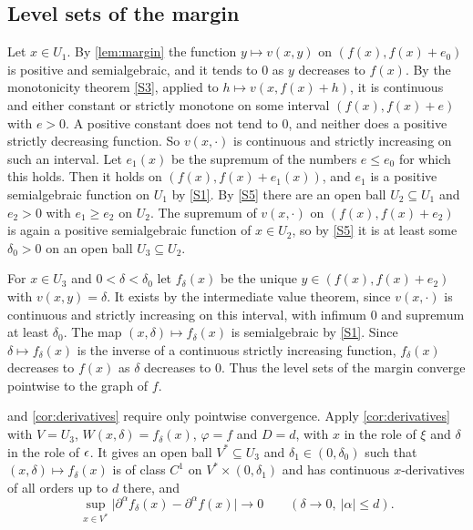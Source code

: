 \subsection{Level sets of the margin}\label{sec:universal-levels}

Let $x\in U_1$. By \cref{lem:margin} the function $y\mapsto v(x,y)$ on $(f(x),f(x)+e_0)$ is positive and semialgebraic, and it tends to $0$ as $y$ decreases to $f(x)$. By the monotonicity theorem \ref{S3}, applied to $h\mapsto v(x,f(x)+h)$, it is continuous and either constant or strictly monotone on some interval $(f(x),f(x)+e)$ with $e>0$. A positive constant does not tend to $0$, and neither does a positive strictly decreasing function. So $v(x,\cdot)$ is continuous and strictly increasing on such an interval. Let $e_1(x)$ be the supremum of the numbers $e\le e_0$ for which this holds. Then it holds on $(f(x),f(x)+e_1(x))$, and $e_1$ is a positive semialgebraic function on $U_1$ by \ref{S1}. By \ref{S5} there are an open ball $U_2\subseteq U_1$ and $e_2>0$ with $e_1\ge e_2$ on $U_2$. The supremum of $v(x,\cdot)$ on $(f(x),f(x)+e_2)$ is again a positive semialgebraic function of $x\in U_2$, so by \ref{S5} it is at least some $\delta_0>0$ on an open ball $U_3\subseteq U_2$.

For $x\in U_3$ and $0<\delta<\delta_0$ let $f_\delta(x)$ be the unique $y\in(f(x),f(x)+e_2)$ with $v(x,y)=\delta$. It exists by the intermediate value theorem, since $v(x,\cdot)$ is continuous and strictly increasing on this interval, with infimum $0$ and supremum at least $\delta_0$. The map $(x,\delta)\mapsto f_\delta(x)$ is semialgebraic by \ref{S1}. Since $\delta\mapsto f_\delta(x)$ is the inverse of a continuous strictly increasing function, $f_\delta(x)$ decreases to $f(x)$ as $\delta$ decreases to $0$. Thus the level sets of the margin converge pointwise to the graph of $f$.

 and \cref{cor:derivatives} require only pointwise convergence. Apply \cref{cor:derivatives} with $V=U_3$, $W(x,\delta)=f_\delta(x)$, $\varphi=f$ and $D=d$, with $x$ in the role of $\xi$ and $\delta$ in the role of $\epsilon$. It gives an open ball $V^*\subseteq U_3$ and $\delta_1\in(0,\delta_0)$ such that $(x,\delta)\mapsto f_\delta(x)$ is of class $C^1$ on $V^*\times(0,\delta_1)$ and has continuous $x$-derivatives of all orders up to $d$ there, and
\begin{equation}\label{eq:levelconv}
\sup_{x\in V^*}\bigl|\partial^\alpha f_\delta(x)-\partial^\alpha f(x)\bigr|\longrightarrow0\qquad(\delta\to0,\ |\alpha|\le d).
\end{equation}

